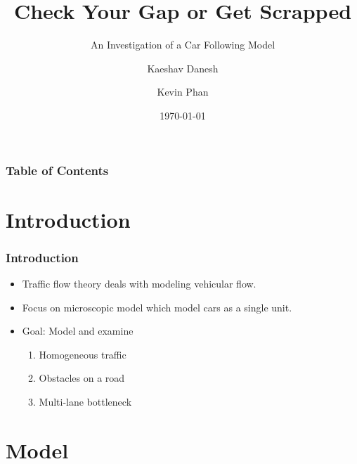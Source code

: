 \documentclass{beamer}
\title[An Investigation of a Car Following Model]{Check Your Gap or Get Scrapped}
\subtitle{An Investigation of a Car Following Model}
\author[Kaeshav Danesh \and Kevin Phan]{Kaeshav Danesh \and Kevin Phan}
\date{\today}
\begin{document}
\frame{\titlepage}

\begin{frame}
    \frametitle{Table of Contents}
    \tableofcontents
    \end{frame}

\section{Introduction}

\begin{frame}
\frametitle{Introduction}
\begin{itemize}
  \item Traffic flow theory deals with modeling vehicular flow.  
  \item Focus on microscopic model which model cars as a single unit.
  \item Goal: Model and examine 
  \begin{enumerate}
    \item Homogeneous traffic
    \item  Obstacles on a road
    \item Multi-lane bottleneck
  \end{enumerate} 
\end{itemize}
\end{frame}

\section{Model}
\end{document}
